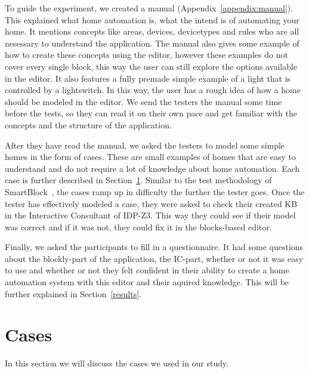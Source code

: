 \documentclass[11pt,a4paper]{report}
\begin{document}
\begin{idplisting}
To guide the experiment, we created a manual (Appendix~\ref{appendix:manual}). This explained what home automation is, what the intend is of automating your home. It mentions concepts like areas, devices, devicetypes and rules who are all nesessary to understand the application. The manual also gives some example of how to create these concepts using the editor, however these examples do not cover every single block, this way the user can still explore the options available in the editor. It also features a fully premade simple example of a light that is controlled by a lightswitch. In this way, the user has a rough idea of how a home should be modeled in the editor. We send the testers the manual some time before the tests, so they can read it on their own pace and get familiar with the concepts and the structure of the application.

After they have read the manual, we asked the testers to model some simple homes in the form of cases. These are small examples of homes that are easy to understand and do not require a lot of knowledge about home automation. Each case is further described in Section~\ref{cases}. Similar to the test methodology of SmartBlock~\cite{SOTA_SmartBlock}, the cases ramp up in difficulty the further the tester goes. Once the tester has effectively modeled a case, they were asked to check their created KB in the Interactive Consultant of IDP-Z3. This way they could see if their model was correct and if it was not, they could fix it in the blocks-based editor.

Finally, we asked the participants to fill in a questionnaire. It had some questions about the blockly-part of the application, the IC-part, whether or not it was easy to use and whether or not they felt confident in their ability to create a home automation system with this editor and their aquired knowledge. This will be further explained in Section~\ref{results}.

\section{Cases}
\label{cases}
In this section we will discuss the cases we used in our study.

\end{idplisting}
\end{document}
